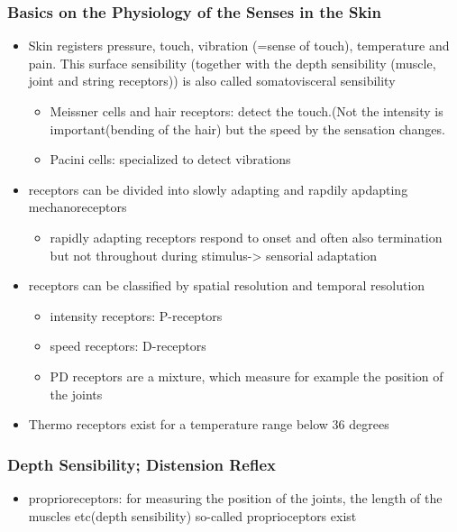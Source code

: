 \documentclass{standalone}
\begin{document}
\subsubsection*{Basics on the Physiology of the Senses in the Skin}
\begin{itemize}
	\item Skin registers pressure, touch, vibration (=sense of touch), temperature and pain. This surface sensibility (together with the depth sensibility (muscle, joint and string receptors)) is also called somatovisceral sensibility
	\begin{itemize}
		\item Meissner cells and hair receptors: detect the touch.(Not the intensity is important(bending of the hair) but the speed by the sensation changes.
		\item Pacini cells: specialized to detect vibrations
	\end{itemize}
	\item receptors can be divided into slowly adapting and rapdily apdapting mechanoreceptors
	\begin{itemize}
		\item rapidly adapting receptors respond to onset and often also termination but not throughout during stimulus-> sensorial adaptation
	\end{itemize}
	\item receptors can be classified by spatial resolution and temporal resolution
	\begin{itemize}
		\item intensity receptors: P-receptors
		\item speed receptors: D-receptors
		\item PD receptors are a mixture, which measure for example the position of the joints
	\end{itemize}
	\item Thermo receptors exist for a temperature range below 36 degrees
\end{itemize}
\subsubsection{Depth Sensibility; Distension Reflex}
\begin{itemize}
	\item proprioreceptors: for measuring the position of the joints, the length of the muscles etc(depth sensibility) so-called proprioceptors exist
\end{itemize}
\end{document}
